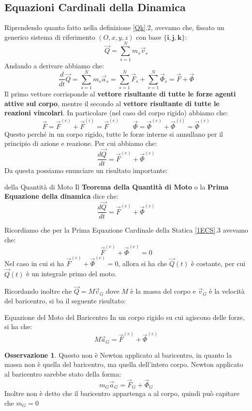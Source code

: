 \documentclass[11pt,a4paper,twoside]{article}
\theoremstyle{definition}
\newtheorem*{oss}{Osservazione}
\begin{document}
\subsection{Equazioni Cardinali della Dinamica}

Riprendendo quanto fatto nella definizione \ref{Qk}.2, avevamo che, fissato un generico sistema di riferimento $(O,x,y,z)$ con base $\{\mathbf i, \mathbf j, \mathbf k\}$:
\[ \vec Q = \sum_{s = 1}^Nm_s \vec v_s \]
Andando a derivare abbiamo che:
\[ \frac d{dt} \vec Q = \sum_{s = 1}^N m_s \vec a_s = \sum_{s=1}^N \vec F_s + \sum_{s = 1}^N \vec \Phi_s = \vec F + \vec \Phi \]
Il primo vettore corrisponde al \textbf{vettore risultante di tutte le forze agenti attive sul corpo}, mentre il secondo al \textbf{vettore risultante di tutte le reazioni vincolari}. In particolare (nel caso del corpo rigido) abbiamo che:
\[ \vec F = \vec F^{(e)} + \vec F^{(i)} = \vec F^{(e)} \qquad \vec \Phi = \vec \Phi^{(e)} + \vec \Phi^{(i)} = \vec \Phi^{(e)} \]
Questo perché in un corpo rigido, tutte le forze interne si annullano per il principio di azione e reazione. Per cui abbiamo che:
\[ \frac {d\vec Q}{dt} = \vec F^{(e)} + \vec \Phi^{(e)} \]
Da questa possiamo enunciare un risultato importante:
\begin{thm}{della Quantità di Moto}{}
	Il \textbf{Teorema della Quantità di Moto} o la \textbf{Prima Equazione della dinamica} dice che:
	\[ \frac{d\vec Q}{dt} = \vec F^{(e)} + \vec \Phi^{(e)} \]
\end{thm}
Ricordiamo che per la Prima Equazione Cardinale della Statica \ref{1ECS}.3 avevamo che:
\[ \vec F^{(e)} + \vec \Phi^{(e)}=0 \]
Nel caso in cui si ha $\vec F^{(e)} + \vec \Phi^{(e)}=0$, allora si ha che $\vec Q(t)$ è costante, per cui $\vec Q(t)$ è un integrale primo del moto.

Ricordando inoltre che $\vec Q = M \vec v_G$ dove $M$ è la massa del corpo e $\vec v_G$ è la velocità del baricentro, si ba il seguente risultato:
\begin{thm}{Equazione del Moto del Baricentro}{}
	In un corpo rigido su cui agiscono delle forze, si ha che:
	\[ M \vec a_G = \vec F^{(e)} + \vec \Phi^{(e)} \]
\end{thm}

\begin{oss}
	Questo non è Newton applicato al baricentro, in quanto la massa non è quella del baricentro, ma quella dell'intero corpo. Newton applicato al baricentro sarebbe stato della forma:
	\[ m_G \vec a_G = \vec F_G + \vec \Phi_G \]
	Inoltre non è detto che il baricentro appartenga a al corpo, quindi può capitare che $m_G = 0$
\end{oss}
\end{document}
